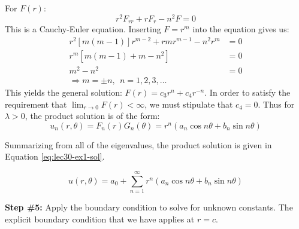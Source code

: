 For $F(r)$:
\begin{equation*}
r^2F_{rr} + rF_{r} - n^2F = 0 
\end{equation*}
This is a Cauchy-Euler equation.  Inserting $F = r^m$ into the equation gives us:
\begin{align*}
r^2[m(m-1)]r^{m-2} + rmr^{m-1} - n^2r^m &= 0 \\
r^m[m(m-1)+m - n^2] &= 0 \\
m^2-n^2 &= 0 \\
\Rightarrow m = \pm n, \ \ n = 1,2,3,\dots
\end{align*}
This yields the general solution: $F(r) = c_3r^n + c_4r^{-n}$.  In order to satisfy the requirement that $\lim_{r \to 0} F(r) < \infty$, we must stipulate that $c_4 = 0$.  Thus for $\lambda > 0$, the product solution is of the form:
\begin{equation*}
u_n(r,\theta) = F_n(r)G_n(\theta) = r^n\left(a_n \cos{n \theta} + b_n \sin{n \theta} \right)
\end{equation*}

\vspace{0.15cm}

\noindent Summarizing from all of the eigenvalues, the product solution is given in Equation \ref{eq:lec30-ex1-sol}.

\begin{equation}
u(r,\theta) = a_0 + \sum\limits_{n=1}^{\infty} r^n \left( a_n \cos{n \theta} + b_n \sin{n \theta} \right)
\label{eq:lec30-ex1-sol}
\end{equation}

\vspace{0.25cm}

\noindent\textbf{Step \#5:} Apply the boundary condition to solve for unknown constants.  The explicit boundary condition that we have applies at $r=c$. 

